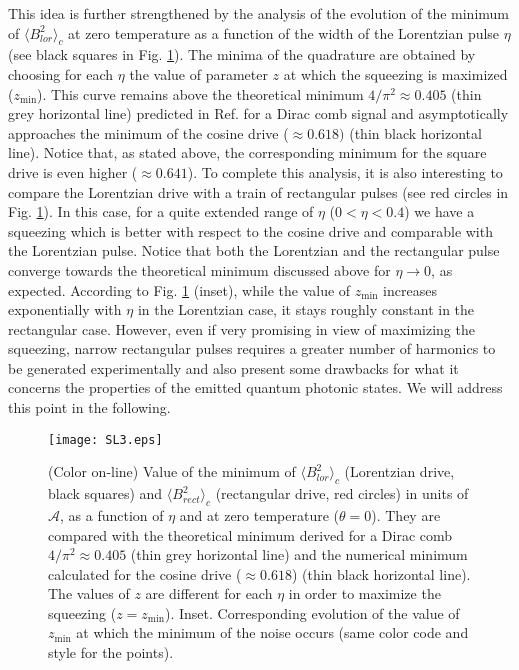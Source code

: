 \documentclass[twocolumn,showpacs,preprintnumbers,amsmath,amssymb%
 aps,
 prb,
 lengthcheck,%
]{revtex4-1}
\begin{document}
This idea is further strengthened by the analysis of the evolution of the minimum of $\langle B^{2}_{lor} \rangle_{c}$ at zero temperature as a function of the width of the Lorentzian pulse $\eta$ (see black squares in Fig. \ref{fig3}). The minima of the quadrature are obtained by choosing for each $\eta$ the value of parameter $z$ at which the squeezing is maximized ($z_{\mathrm{min}}$). This curve remains above the theoretical minimum $4/\pi^2\approx0.405$ (thin grey horizontal line) predicted in Ref.  for a Dirac comb signal and asymptotically approaches the minimum of the cosine drive ($\approx 0.618)$ (thin black horizontal line). \cite{gasse_observation_2013} Notice that, as stated above, the corresponding minimum for the square drive is even higher  ($\approx 0.641$). To complete this analysis, it is also interesting to compare the Lorentzian drive with a train of rectangular pulses (see red circles in Fig. \ref{fig3}). In this case, for a quite extended range of $\eta$ ($0<\eta<0.4$) we have a squeezing which is better with respect to the cosine drive and comparable with the Lorentzian pulse.  Notice that both the Lorentzian and the rectangular pulse converge towards the theoretical minimum discussed above for $\eta \rightarrow 0$, as expected. According to Fig. \ref{fig3} (inset), while the value of $z_{\mathrm{min}}$ increases exponentially with $\eta$ in the Lorentzian case, it stays roughly constant in the rectangular case. However, even if very promising in view of maximizing the squeezing, narrow rectangular pulses requires a greater number of harmonics to be generated experimentally and also present some drawbacks for what it concerns the properties of the emitted quantum photonic states. We will address this point in the following. 
\begin{figure}[h]
\centering
\texttt{[image: SL3.eps]}
\caption{(Color on-line) Value of the minimum of $\langle B^{2}_{lor} \rangle_{c}$ (Lorentzian drive, black squares) and $\langle B^{2}_{rect} \rangle_{c}$ (rectangular drive, red circles) in units of $\mathcal{A}$, as a function of $\eta$ and at zero temperature ($\theta=0$). They are compared with the theoretical minimum derived for a Dirac comb $4/\pi^2\approx0.405$ (thin grey horizontal line) and the numerical minimum calculated for the cosine drive ($\approx 0.618$) (thin black horizontal line). The values of $z$ are different for each $\eta$ in order to maximize the squeezing ($z=z_{\mathrm{min}}$). Inset. Corresponding evolution of the value of $z_{\mathrm{min}}$ at which the minimum of the noise occurs (same color code and style for the points).} 
\label{fig3}
\end{figure}
\end{document}

